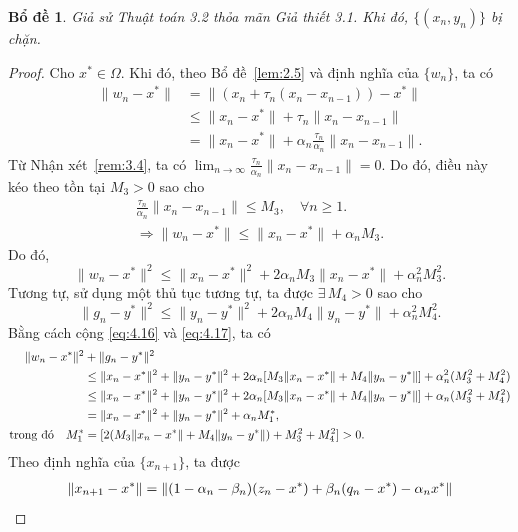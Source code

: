 \documentclass[11pt,a4paper]{article}
\theoremstyle{plain}
\newtheorem{lemma}[theorem]{Bổ đề}
\theoremstyle{definition}
\theoremstyle{remark}
\numberwithin{equation}{section}
\newcommand{\nm}[1]{\lVert #1\rVert}
\begin{document}
\begin{lemma}\label{lem:4.4}
Giả sử Thuật toán 3.2 thỏa mãn Giả thiết 3.1. Khi đó, $\{(x_n,y_n)\}$ bị chặn.
\end{lemma}

\begin{proof}
Cho $x^{*}\in\Omega$. Khi đó, theo Bổ đề~\ref{lem:2.5} và định nghĩa của $\{w_n\}$, ta có
\begin{align*}
\nm{w_n-x^{*}} &= \nm{(x_n+\tau_n(x_n-x_{n-1}))-x^{*}}\\
&\le \nm{x_n-x^{*}}+\tau_n\nm{x_n-x_{n-1}}\\
&= \nm{x_n-x^{*}}+\alpha_n\frac{\tau_n}{\alpha_n}\nm{x_n-x_{n-1}}.
\end{align*}
Từ Nhận xét~\ref{rem:3.4}, ta có $\lim_{n\to\infty}\frac{\tau_n}{\alpha_n}\nm{x_n-x_{n-1}}=0$. Do đó, điều này kéo theo tồn tại $M_3>0$ sao cho
\begin{align*}
\frac{\tau_n}{\alpha_n}\nm{x_n-x_{n-1}}\le M_3,\quad\forall n\ge 1.\\
\Longrightarrow \nm{w_n-x^{*}}\le\nm{x_n-x^{*}}+\alpha_n M_3.
\end{align*}
Do đó,
\begin{equation}
\nm{w_n-x^{*}}^2\le\nm{x_n-x^{*}}^2+2\alpha_n M_3\nm{x_n-x^{*}}+\alpha_n^2 M_3^2. \label{eq:4.16}
\end{equation}
Tương tự, sử dụng một thủ tục tương tự, ta được $\exists\,M_4>0$ sao cho
\begin{equation}
\nm{g_n-y^{*}}^2\le\nm{y_n-y^{*}}^2+2\alpha_n M_4\nm{y_n-y^{*}}+\alpha_n^2 M_4^2. \label{eq:4.17}
\end{equation}
Bằng cách cộng \eqref{eq:4.16} và \eqref{eq:4.17}, ta có
\begin{align}
\nm{w_n-x^{*}}^2 &+ \nm{g_n-y^{*}}^2\notag\\
&\le \nm{x_n-x^{*}}^2+\nm{y_n-y^{*}}^2+2\alpha_n[M_3\nm{x_n-x^{*}}+M_4\nm{y_n-y^{*}}]+\alpha_n^2(M_3^2+M_4^2)\notag\\
&\le \nm{x_n-x^{*}}^2+\nm{y_n-y^{*}}^2+2\alpha_n[M_3\nm{x_n-x^{*}}+M_4\nm{y_n-y^{*}}]+\alpha_n(M_3^2+M_4^2)\notag\\
&= \nm{x_n-x^{*}}^2+\nm{y_n-y^{*}}^2+\alpha_n M_1^{*},\notag\\
\text{trong đó}\quad M_1^{*} &= [2(M_3\nm{x_n-x^{*}}+M_4\nm{y_n-y^{*}})+M_3^2+M_4^2]>0. \label{eq:4.18}
\end{align}
Theo định nghĩa của $\{x_{n+1}\}$, ta được
\begin{align}
\nm{x_{n+1}-x^{*}} &= \nm{(1-\alpha_n-\beta_n)(z_n-x^{*})+\beta_n(q_n-x^{*})-\alpha_n x^{*}}\notag\\

\end{align}
\end{proof}
\end{document}
